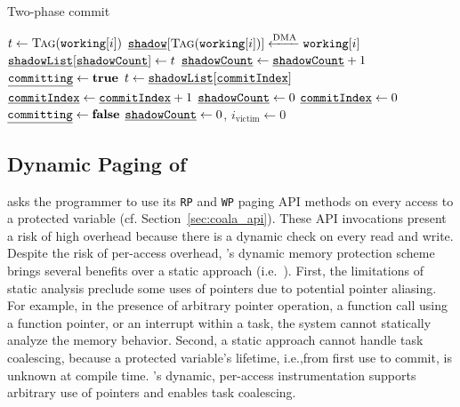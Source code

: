 \begin{algorithm}[t]
	\caption{Two-phase commit}
	\label{algo:commit}
	\scriptsize
	\begin{algorithmic}[1]
         
                \State $t \gets \Call{Tag}{\texttt{working}[i]}$
                \State $\texttt{\underline{shadow}}[\Call{Tag}{\texttt{working}[i]}] \xleftarrow{\text{DMA}} \texttt{working}[i]$
                \State $\texttt{\underline{shadowList}}[\texttt{\underline{shadowCount}}] \gets t$
                \State $\texttt{\underline{shadowCount}} \gets \texttt{\underline{shadowCount}} + 1$
            \EndFor
            \State {}
        \EndProcedure
         
            \State $\texttt{\underline{committing}} \gets \textbf{true}$
                \State $t \gets \texttt{\underline{shadowList}}[\texttt{\underline{commitIndex}}]$
                \State {}
                \State $\texttt{\underline{commitIndex}} \gets \texttt{\underline{commitIndex}} + 1$
            \EndWhile
            \State $\texttt{\underline{shadowCount}} \gets 0$
            \State $\texttt{\underline{commitIndex}} \gets 0$
            \State $\texttt{\underline{committing}} \gets \textbf{false}$
        \EndProcedure
         
             
            \EndIf
            \State $\texttt{\underline{shadowCount}} \gets 0$, $i_\text{victim} \gets 0$
        \EndProcedure
	\end{algorithmic}
\end{algorithm}

\subsection{Dynamic Paging of \sys}

\sys asks the programmer to use its {\tt RP} and {\tt WP} paging API methods on every access to a protected variable (cf. Section~\ref{sec:coala_api}). These API invocations present a risk of high overhead because there is a dynamic check on every read and write. Despite the risk of per-access overhead, \sys's dynamic memory protection scheme brings several benefits over a static approach (i.e.~\cite{alpaca}). First, the limitations of static analysis preclude some uses of pointers due to potential pointer aliasing. For example, in the presence of arbitrary pointer operation, a function call using a function pointer, or an interrupt within a task, the system cannot statically analyze the memory behavior. Second, a static approach cannot handle task coalescing, because a protected variable's lifetime, i.e.,from first use to commit, is unknown at compile time. \sys's dynamic, per-access instrumentation supports arbitrary use of pointers and enables task coalescing.